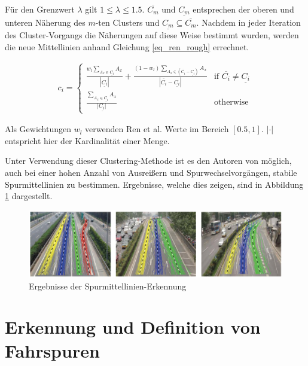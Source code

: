 Für den Grenzwert $\lambda$ gilt $1 \leq \lambda \leq 1.5$. $\overline{C_m}$ und $\underline{C_m}$ entsprechen der oberen und unteren
Näherung des $m$-ten Clusters und $\underline{C_m} \subseteq \overline{C_m}$.
Nachdem in jeder Iteration des Cluster-Vorgangs die Näherungen auf diese Weise bestimmt wurden, werden die neue Mittellinien
anhand Gleichung \ref{eq_ren_rough} errechnet.

\begin{ceqn}
\begin{align}
    \label{eq_ren_rough}
    c_i =
    \begin{cases}
        \frac{w_l \sum_{A_x \in \underline{C_i}} A_x}{|\underline{C_i}|} + \frac{(1 - w_l) \sum_{A_x \in (\overline{C_i} - \underline{C_i})} A_x}{|\overline{C_i} - \underline{C_i}|} & \text{if } \overline{C_i} \neq \underline{C_i} \\
        \frac{\sum_{A_x \in \underline{C_i}} A_x}{|\underline{C_i|}} & \text{otherwise}
    \end{cases}
\end{align}
\end{ceqn}

Als Gewichtungen $w_l$ verwenden Ren et al. Werte im Bereich $[0.5, 1]$. $| \cdot |$ entspricht hier der Kardinalität einer Menge.

Unter Verwendung dieser Clustering-Methode ist es den Autoren von \cite[]{Ren2014} möglich, auch bei einer hohen Anzahl von
Ausreißern und Spurwechselvorgängen, stabile Spurmittellinien zu bestimmen. Ergebnisse, welche dies zeigen, sind in Abbildung
\ref{fig:relw_ren_example_detection} dargestellt.

\begin{figure}[H]
    \centering
    \includegraphics[width=0.95\linewidth]{../resources/img/RelatedWork/ren_examples_detection}
    \caption[Ergebnisse der Spurmittellinien-Erkennung (Ren et al.)]{Ergebnisse der Spurmittellinien-Erkennung \cite[]{Ren2014}}
    \label{fig:relw_ren_example_detection}
\end{figure}


\section{Erkennung und Definition von Fahrspuren}
\label{sec:rw_lane_detection}

